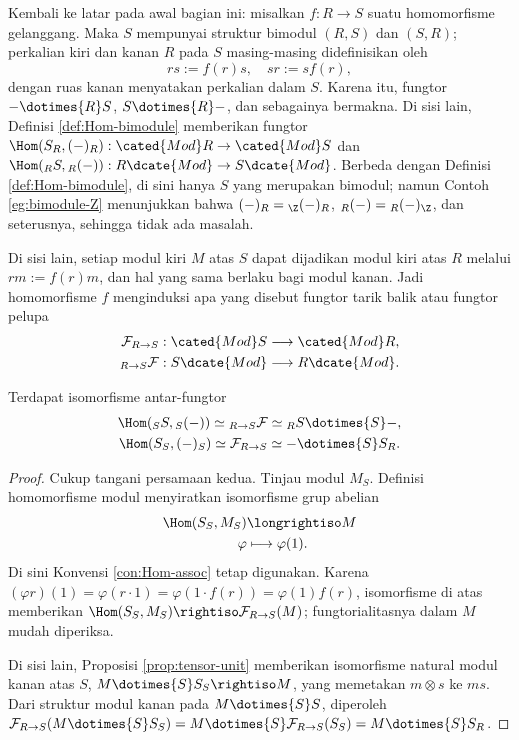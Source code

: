 Kembali ke latar pada awal bagian ini: misalkan $f: R \to S$ suatu homomorfisme gelanggang. Maka $S$ mempunyai struktur bimodul $(R, S)$ dan $(S, R)$; perkalian kiri dan kanan $R$ pada $S$ masing-masing didefinisikan oleh
\[ rs := f(r)s, \quad sr := sf(r), \]
dengan ruas kanan menyatakan perkalian dalam $S$. Karena itu, fungtor $- \dotimes{R} S$, $S \dotimes{R} -$, dan sebagainya bermakna. Di sisi lain, Definisi \ref{def:Hom-bimodule} memberikan fungtor $\Hom(S_R, (-)_R): \cated{Mod}R \to \cated{Mod}S$ dan $\Hom({}_R S, {}_R (-)): R\dcate{Mod} \to S\dcate{Mod}$. Berbeda dengan Definisi \ref{def:Hom-bimodule}, di sini hanya $S$ yang merupakan bimodul; namun Contoh \ref{eg:bimodule-Z} menunjukkan bahwa $(-)_R = {}_\Z (-)_R$, ${}_R (-) = {}_R (-)_\Z$, dan seterusnya, sehingga tidak ada masalah.

Di sisi lain, setiap modul kiri $M$ atas $S$ dapat dijadikan modul kiri atas $R$ melalui $rm := f(r)m$, dan hal yang sama berlaku bagi modul kanan. Jadi homomorfisme $f$ menginduksi apa yang disebut fungtor tarik balik atau fungtor pelupa  
\begin{align*}
	\mathcal{F}_{R \to S}: \cated{Mod}S & \longrightarrow \cated{Mod}R, \\
	{}_{R \to S} \mathcal{F}: S\dcate{Mod} & \longrightarrow R\dcate{Mod}.
\end{align*}

\begin{lemma}\label{prop:forgetful-as-tensor-Hom}
	Terdapat isomorfisme antar-fungtor
	\begin{gather*}
		\Hom({}_S S, {}_S (-)) \simeq {}_{R \to S} \mathcal{F} \simeq {}_R S \dotimes{S} - , \\
		\Hom(S_S, (-)_S) \simeq \mathcal{F}_{R \to S} \simeq - \dotimes{S} S_R.
	\end{gather*}
\end{lemma}
\begin{proof}
	Cukup tangani persamaan kedua. Tinjau modul $M_S$. Definisi homomorfisme modul menyiratkan isomorfisme grup abelian
	\begin{align*}
		\Hom(S_S, M_S) & \longrightiso M \\
		\varphi & \longmapsto \varphi(1).
	\end{align*}
	Di sini Konvensi \ref{con:Hom-assoc} tetap digunakan. Karena $(\varphi r)(1) = \varphi(r \cdot 1) = \varphi(1 \cdot f(r)) = \varphi(1) f(r)$, isomorfisme di atas memberikan $\Hom(S_S, M_S) \rightiso \mathcal{F}_{R \to S}(M)$; fungtorialitasnya dalam $M$ mudah diperiksa.

	Di sisi lain, Proposisi \ref{prop:tensor-unit} memberikan isomorfisme natural modul kanan atas $S$, $M \dotimes{S} S_S \rightiso M$, yang memetakan $m \otimes s$ ke $ms$. Dari struktur modul kanan pada $M \dotimes{S} S$, diperoleh $\mathcal{F}_{R \to S} (M \dotimes{S} S_S) = M \dotimes{S} \mathcal{F}_{R \to S}(S_S) = M \dotimes{S} S_R$.
\end{proof}

